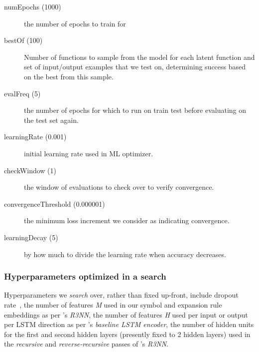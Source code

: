 \documentclass{article}
\begin{document}
\begin{description}
    \item[numEpochs (1000)] the number of epochs to train for 
    \item[bestOf (100)] Number of functions to sample from the model for each latent function and set of input/output examples that we test on, determining success based on the best from this sample.
    \item[evalFreq (5)] the number of epochs for which to run on train test before evaluating on the test set again.
    \item[learningRate (0.001)] initial learning rate used in ML optimizer.
    \item[checkWindow (1)] the window of evaluations to check over to verify convergence.
    \item[convergenceThreshold (0.000001)] the minimum loss increment we consider as indicating convergence.
    \item[learningDecay (5)] by how much to divide the learning rate when accuracy decreases.
\end{description}

\subsubsection{Hyperparameters optimized in a search} \label{sec:hparopt}

Hyperparameters we \emph{search} over, rather than fixed up-front,
include
dropout rate~\citep{baldi2014dropout},
the number of features \emph{M} used in our symbol and expansion rule embeddings as per \citet{nsps}'s \emph{R3NN},
the number of features \emph{H} used per input or output per LSTM direction as per \citet{nsps}'s \emph{baseline LSTM encoder},
the number of hidden units for the first and second hidden layers (presently fixed to 2 hidden layers) used in the \emph{recursive} and \emph{reverse-recursive} passes of \citet{nsps}'s \emph{R3NN}.
\end{document}
